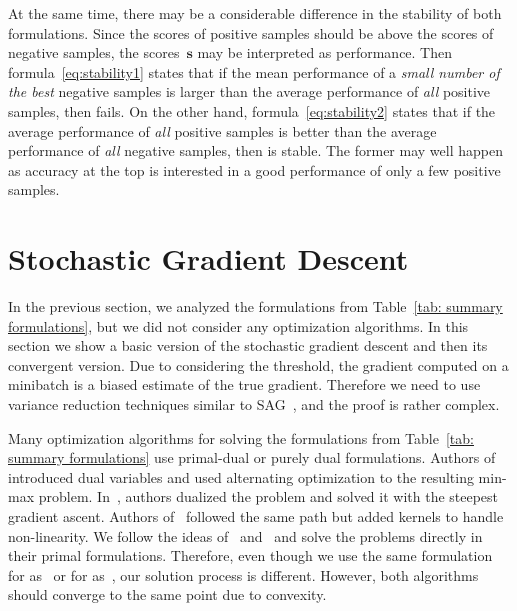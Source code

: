 At the same time, there may be a considerable difference in the stability of both formulations. Since the scores of positive samples should be above the scores of negative samples, the scores~$\bm{s}$ may be interpreted as performance. Then formula~\eqref{eq:stability1} states that if the mean performance of a \emph{small number of the best} negative samples is larger than the average performance of \emph{all} positive samples, then \tauFPL fails. On the other hand, formula~\eqref{eq:stability2} states that if the average performance of \emph{all} positive samples is better than the average performance of \emph{all} negative samples, then \PatMatNP is stable. The former may well happen as accuracy at the top is interested in a good performance of only a few positive samples.

\section{Stochastic Gradient Descent}\label{sec:convergence}

In the previous section, we analyzed the formulations from Table~\ref{tab: summary formulations}, but we did not consider any optimization algorithms. In this section we show a basic version of the stochastic gradient descent and then its convergent version. Due to considering the threshold, the gradient computed on a minibatch is a biased estimate of the true gradient. Therefore we need to use variance reduction techniques similar to SAG~\cite{schmidt2017minimizing}, and the proof is rather complex.

Many optimization algorithms for solving the formulations from Table~\ref{tab: summary formulations} use primal-dual or purely dual formulations. Authors of~\cite{eban2017scalable} introduced dual variables and used alternating optimization to the resulting min-max problem. In~\cite{li2014top, zhang2018tau}, authors dualized the problem and solved it with the steepest gradient ascent. Authors of~\cite{macha2020nonlinear} followed the same path but added kernels to handle non-linearity. We follow the ideas of~\cite{mackey2018constrained} and~\cite{adam2019machine} and solve the problems directly in their primal formulations. Therefore, even though we use the same formulation for \TopPush as~\cite{li2014top} or for \tauFPL as~\cite{zhang2018tau}, our solution process is different. However, both algorithms should converge to the same point due to convexity.

